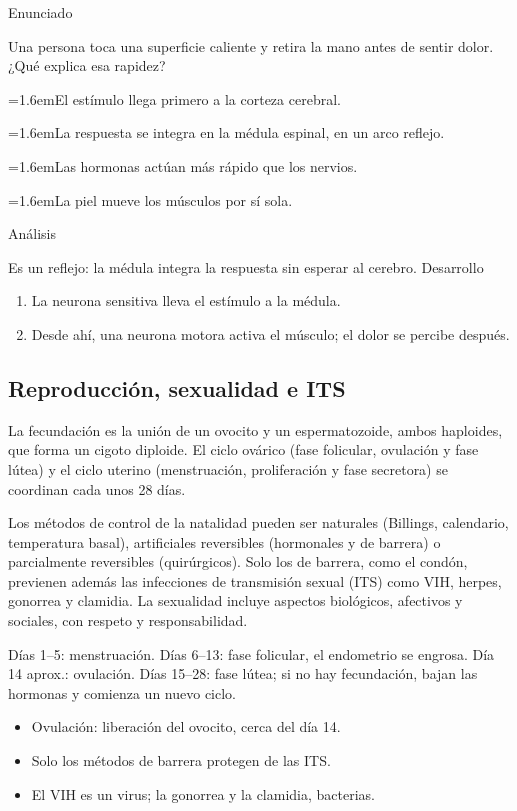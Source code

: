 \documentclass[10pt,a4paper,twocolumn]{article}
\newcommand{\alternativa}[2]{\par\noindent\hangindent=1.6em\hangafter=1\makebox[1.6em][l]{\tecla{#1}}#2\par}
\newcommand{\clave}[1]{\par\smallskip{\sffamily\footnotesize\color{esmeralda} Clave \teclaok{#1}}\par}
\begin{document}
\begin{ejemplo}
{\sffamily\footnotesize\color{zinc500} Enunciado}\par
Una persona toca una superficie caliente y retira la mano antes de sentir dolor. ¿Qué explica esa rapidez?
\alternativa{A}{El estímulo llega primero a la corteza cerebral.}
\alternativa{B}{La respuesta se integra en la médula espinal, en un arco reflejo.}
\alternativa{C}{Las hormonas actúan más rápido que los nervios.}
\alternativa{D}{La piel mueve los músculos por sí sola.}
\clave{B}
{\sffamily\footnotesize\color{zinc500} Análisis}\par Es un reflejo: la médula integra la respuesta sin esperar al cerebro.
{\sffamily\footnotesize\color{zinc500} Desarrollo}
\begin{enumerate}
  \item La neurona sensitiva lleva el estímulo a la médula.
  \item Desde ahí, una neurona motora activa el músculo; el dolor se percibe después.
\end{enumerate}
\end{ejemplo}

\subsection{Reproducción, sexualidad e ITS}

La fecundación es la unión de un ovocito y un espermatozoide, ambos haploides, que forma un cigoto diploide. El ciclo ovárico (fase folicular, ovulación y fase lútea) y el ciclo uterino (menstruación, proliferación y fase secretora) se coordinan cada unos 28 días.

Los métodos de control de la natalidad pueden ser naturales (Billings, calendario, temperatura basal), artificiales reversibles (hormonales y de barrera) o parcialmente reversibles (quirúrgicos). Solo los de barrera, como el condón, previenen además las infecciones de transmisión sexual (ITS) como VIH, herpes, gonorrea y clamidia. La sexualidad incluye aspectos biológicos, afectivos y sociales, con respeto y responsabilidad.

\begin{mecanismo}
Días 1–5: menstruación. Días 6–13: fase folicular, el endometrio se engrosa. Día 14 aprox.: ovulación. Días 15–28: fase lútea; si no hay fecundación, bajan las hormonas y comienza un nuevo ciclo.
\end{mecanismo}

\begin{ideasclave}
\begin{itemize}
  \item Ovulación: liberación del ovocito, cerca del día 14.
  \item Solo los métodos de barrera protegen de las ITS.
  \item El VIH es un virus; la gonorrea y la clamidia, bacterias.
\end{itemize}
\end{ideasclave}
\end{document}
